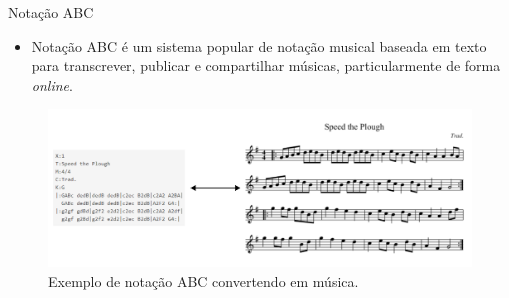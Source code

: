 \documentclass{beamer}
\begin{document}
    \begin{frame}{Notação ABC}
        \vspace{0.1cm}
        \begin{itemize}
            \justifying
            \item Notação ABC é um sistema popular de notação musical baseada em texto para transcrever, publicar e compartilhar músicas, particularmente de forma \textit{online}. 
        \end{itemize}

        \begin{figure}
            \vspace{-0.5cm}
            \centering
            \includegraphics[scale=0.25]{figuras/abc_notation_example.pdf}
	        \caption{Exemplo de notação ABC convertendo em música.}
        \end{figure}
    \end{frame}
\end{document}
